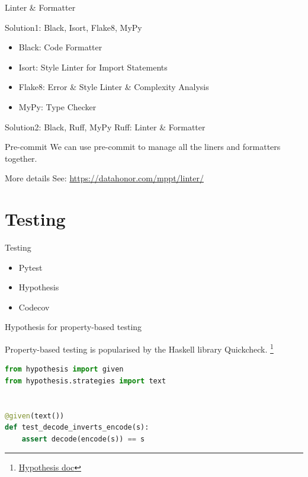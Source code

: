 \documentclass{ctexbeamer}
\begin{document}
\begin{frame}{Linter \& Formatter}
    \begin{exampleblock}{Solution1: Black, Isort, Flake8, MyPy}
        \begin{itemize}
            \item Black: Code Formatter
            \item Isort: Style Linter for Import Statements
            \item Flake8: Error \& Style Linter \& Complexity Analysis
            \item MyPy: Type Checker
        \end{itemize}
    \end{exampleblock}

    \pause

    \begin{exampleblock}{Solution2: Black, Ruff, MyPy}
        Ruff: Linter \& Formatter
    \end{exampleblock}

    \pause 

    \begin{exampleblock}{Pre-commit}
        We can use pre-commit to manage all the liners and formatters together.
    \end{exampleblock}

\end{frame}

\begin{frame}{More details}
    See: \href{https://datahonor.com/mppt/linter/}{https://datahonor.com/mppt/linter/}
\end{frame}

\section{Testing}
\begin{frame}{Testing}
    \begin{itemize}
        \item Pytest
        \item Hypothesis
        \item Codecov
    \end{itemize}
\end{frame}

\begin{frame}[fragile]{Hypothesis for property-based testing}

Property-based testing is popularised by the Haskell library Quickcheck.
\footnote{\tiny \href{https://hypothesis.readthedocs.io/en/latest/index.html}{Hypothesis doc}}

\begin{lstlisting}[language=Python]
from hypothesis import given
from hypothesis.strategies import text


@given(text())
def test_decode_inverts_encode(s):
    assert decode(encode(s)) == s

\end{lstlisting}

\end{frame}
\end{document}

